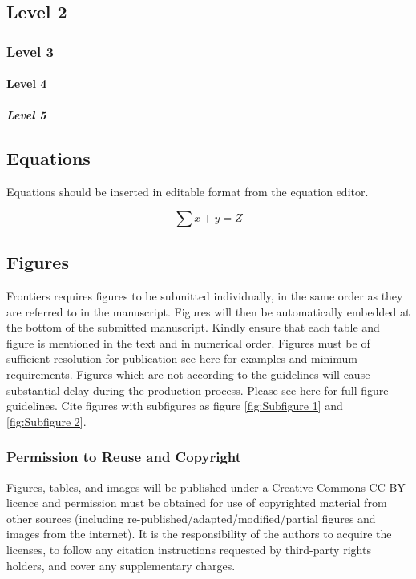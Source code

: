 \documentclass[utf8]{FrontiersinVancouver}
\begin{document}

\subsection{Level 2}
\subsubsection{Level 3}
\paragraph{Level 4}
\subparagraph{Level 5}

\subsection{Equations}
Equations should be inserted in editable format from the equation editor.

\begin{equation}
\sum x+ y =Z\label{eq:01}
\end{equation}

\subsection{Figures}
Frontiers requires figures to be submitted individually, in the same order as they are referred to in the manuscript. Figures will then be automatically embedded at the bottom of the submitted manuscript. Kindly ensure that each table and figure is mentioned in the text and in numerical order. Figures must be of sufficient resolution for publication \href{https://www.frontiersin.org/about/author-guidelines#ImageSizeRequirements}{see here for examples and minimum requirements}. Figures which are not according to the guidelines will cause substantial delay during the production process. Please see \href{https://www.frontiersin.org/about/author-guidelines#FigureRequirementsStyleGuidelines}{here} for full figure guidelines. Cite figures with subfigures as figure \ref{fig:Subfigure 1} and \ref{fig:Subfigure 2}.


\subsubsection{Permission to Reuse and Copyright}
Figures, tables, and images will be published under a Creative Commons CC-BY licence and permission must be obtained for use of copyrighted material from other sources (including re-published/adapted/modified/partial figures and images from the internet). It is the responsibility of the authors to acquire the licenses, to follow any citation instructions requested by third-party rights holders, and cover any supplementary charges.
\end{document}
